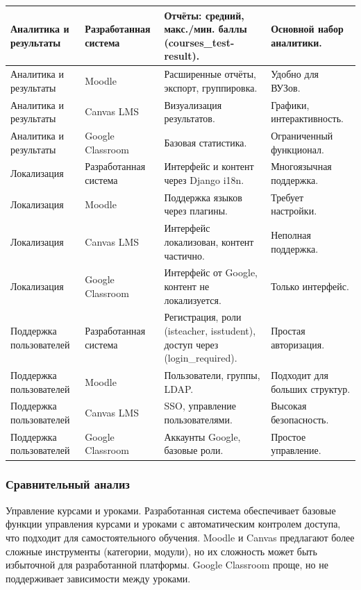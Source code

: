 \begin{xltabular}{\textwidth}{|p{3.1cm}|p{3.1cm}|p{3.5cm}|X|}
	Аналитика и результаты & Разработанная система & Отчёты: средний, макс./мин. баллы (courses\_test-result). & Основной набор аналитики. \\ \hline
	Аналитика и результаты & Moodle & Расширенные отчёты, экспорт, группировка. & Удобно для ВУЗов. \\ \hline
	Аналитика и результаты & Canvas LMS & Визуализация результатов. & Графики, интерактивность. \\ \hline
	Аналитика и результаты & Google Classroom & Базовая статистика. & Ограниченный функционал. \\ \hline
	
	Локализация & Разработанная система & Интерфейс и контент через Django i18n. & Многоязычная поддержка. \\ \hline
	Локализация & Moodle & Поддержка языков через плагины. & Требует настройки. \\ \hline
	Локализация & Canvas LMS & Интерфейс локализован, контент частично. & Неполная поддержка. \\ \hline
	Локализация & Google Classroom & Интерфейс от Google, контент не локализуется. & Только интерфейс. \\ \hline
	
	Поддержка пользователей & Разработанная система & Регистрация, роли (isteacher, isstudent), доступ через (login\_required). & Простая авторизация. \\ \hline
	Поддержка пользователей & Moodle & Пользователи, группы, LDAP. & Подходит для больших структур. \\ \hline
	Поддержка пользователей & Canvas LMS & SSO, управление пользователями. & Высокая безопасность. \\ \hline
	Поддержка пользователей & Google Classroom & Аккаунты Google, базовые роли. & Простое управление. \\ \hline
\end{xltabular}




\subsubsection{Сравнительный анализ}

{Управление курсами и уроками.} Разработанная система обеспечивает базовые функции управления курсами и уроками с автоматическим контролем доступа, что подходит для самостоятельного обучения. Moodle и Canvas предлагают более сложные инструменты (категории, модули), но их сложность может быть избыточной для разработанной платформы. Google Classroom проще, но не поддерживает зависимости между уроками.

